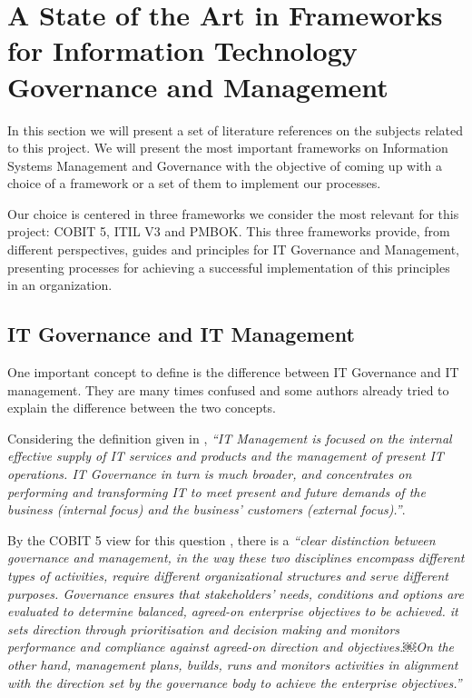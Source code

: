 
% 
% 


\section{A State of the Art in Frameworks for Information Technology Governance and Management}

In this section we will present a set of literature references on the subjects related to this project. We will present the most important frameworks on Information Systems Management and Governance with the objective of coming up with a choice of a framework or a set of them to implement our processes.\par
Our choice is centered in three frameworks we consider the most relevant for this project: COBIT 5, ITIL V3 and PMBOK. This three frameworks provide, from different perspectives, guides and principles for IT Governance and Management, presenting processes for achieving a successful implementation of this principles in an organization.

\subsection{IT Governance and IT Management}

One important concept to define is the difference between IT Governance and IT management. They are many times confused and some authors already tried to explain the difference between the two concepts.\par
Considering the definition given in \cite{ITGovAndMech}, \textit{``IT Management is focused on the internal effective supply of IT services and products and the management of present IT operations. IT Governance in turn is much broader, and concentrates on performing and transforming IT to meet present and future demands of the business (internal focus) and the business' customers (external focus).''}.\par
 By the COBIT 5 view for this question \cite{2012cobit}, there is a \textit{``clear distinction between governance and management, in the way these two disciplines encompass different types of activities, require different organizational structures and serve different purposes. Governance ensures that stakeholders' needs, conditions and options are evaluated to determine balanced, agreed-on enterprise objectives to be achieved. it sets direction through prioritisation and decision making and monitors performance and compliance against agreed-on direction and objectives.￼On the other hand, management plans, builds, runs and monitors activities in alignment with the direction set by the governance body to achieve the enterprise objectives.''}\par


